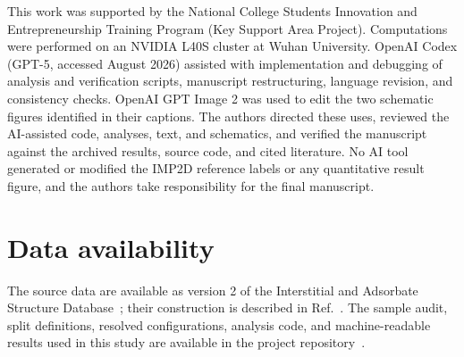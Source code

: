 \documentclass[aps,prb,reprint,superscriptaddress,floatfix,longbibliography]{revtex4-2}
\begin{document}
\begin{acknowledgments}
This work was supported by the National College Students Innovation and
Entrepreneurship Training Program (Key Support Area Project).
Computations were performed on an NVIDIA L40S cluster at Wuhan University.
OpenAI Codex (GPT-5, accessed August 2026) assisted with implementation and
debugging of analysis and verification scripts, manuscript restructuring,
language revision, and consistency checks. OpenAI GPT Image 2 was used to edit
the two schematic figures identified in their captions. The authors directed
these uses, reviewed the AI-assisted code, analyses, text, and schematics, and
verified the manuscript against the archived results, source code, and cited
literature. No AI tool generated or modified the IMP2D reference labels or any
quantitative result figure, and the authors take responsibility for the final
manuscript.
\end{acknowledgments}

\section*{Data availability}
The source data are available as version 2 of the Interstitial and Adsorbate
Structure Database~\cite{imp2d_dataset2022}; their construction is described in
Ref.~\cite{imp2d2023}.  The sample audit, split definitions, resolved
configurations, analysis code, and machine-readable results used in this study
are available in the project repository~\cite{dart_repository2026}.


\end{document}

